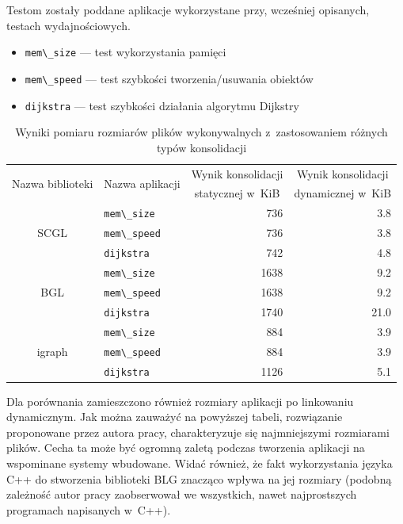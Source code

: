 \documentclass[a4paper,12pt,polish,oneside,openright]{thesis}
\newcommand\code[1]{\lstinline[style=line]{#1}}
\begin{document}
Testom zostały poddane aplikacje wykorzystane przy, wcześniej opisanych, testach wydajnościowych.
\begin{itemize}
	\item \code{mem\_size} --- test wykorzystania pamięci
	\item \code{mem\_speed} --- test szybkości tworzenia/usuwania obiektów
	\item \code{dijkstra} --- test szybkości działania algorytmu Dijkstry
\end{itemize}
\begin{table}[htb]
\caption{Wyniki pomiaru rozmiarów plików wykonywalnych z~zastosowaniem różnych typów konsolidacji}
\label{tab:static}
\centering
\begin{tabular}{ | c | l | r | r |}
	\hline
	\multirow{2}{*}{Nazwa biblioteki} & \multirow{2}{*}{Nazwa aplikacji} & \multicolumn{1}{|c|}{Wynik konsolidacji} & \multicolumn{1}{|c|}{Wynik konsolidacji} \\
		& & \multicolumn{1}{|c|}{statycznej w~KiB} & \multicolumn{1}{|c|}{dynamicznej w~KiB} \\
	\hline \hline
	\multirow{3}{*}{SCGL}   & \code{mem\_size}  & 736   & 3.8   \\ \cline{2-4}
							& \code{mem\_speed} & 736   & 3.8   \\ \cline{2-4}
							& \code{dijkstra}   & 742   & 4.8   \\ \hline
	\multirow{3}{*}{BGL}    & \code{mem\_size}  & 1638  & 9.2   \\ \cline{2-4}
							& \code{mem\_speed} & 1638  & 9.2   \\ \cline{2-4}
							& \code{dijkstra}   & 1740  & 21.0  \\ \hline
	\multirow{3}{*}{igraph} & \code{mem\_size}  & 884   & 3.9   \\ \cline{2-4}
							& \code{mem\_speed} & 884   & 3.9   \\ \cline{2-4}
							& \code{dijkstra}   & 1126  & 5.1   \\ \hline
\end{tabular}
\end{table}
Dla porównania zamieszczono również rozmiary aplikacji po linkowaniu dynamicznym.
Jak można zauważyć na powyższej tabeli, rozwiązanie proponowane przez autora pracy, charakteryzuje się najmniejszymi rozmiarami plików. Cecha ta może być ogromną zaletą podczas tworzenia aplikacji na wspominane systemy wbudowane.
Widać również, że fakt wykorzystania języka C++ do stworzenia biblioteki BLG znacząco wpływa na jej rozmiary (podobną zależność autor pracy zaobserwował we wszystkich, nawet najprostszych programach napisanych w~C++).
\end{document}
